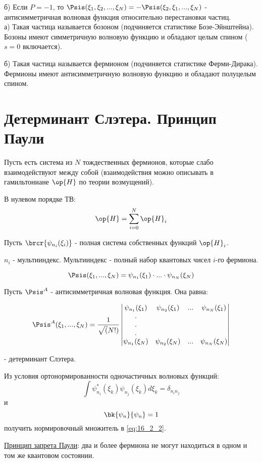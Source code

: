 б) Если $P = -1$, то  $\Psis(\xi_1, \xi_2, ..., \xi_N) = -\Psis(\xi_2, \xi_1, ..., \xi_N)$ - антисимметричная волновая функция относительно перестановки частиц.\\

а) Такая частица называется бозоном (подчиняется статистике Бозе-Эйнштейна). Бозоны имеют симметричную волновую функцию и обладают целым спином ($s = 0$ включается).

б) Такая частица называется фермионом (подчиняется статистике Ферми-Дирака). Фермионы имеют антисимметричную волновую функцию и обладают полуцелым спином.

\section{Детерминант Слэтера. Принцип Паули}

Пусть есть система из $N$ тождественных фермионов, которые слабо взаимодействуют между собой (взаимодействия можно описывать в гамильтониане $\op{H}$ по теории возмущений).

В нулевом порядке ТВ:
$$
\op{H} = \sum_{i=0}^N\op{H}_i
$$

Пусть $\brcr{\psi_{n_i}(\xi_i)}$ - полная система собственных функций $\op{H}_i$.

$n_i$ - мультииндекс. Мультииндекс - полный набор квантовых чисел $i$-го фермиона.

\begin{equation}
\label{eq:16_2_1}
\Psis(\xi_1, ..., \xi_N) = \psi_{n_1}(\xi_1) \cdot ... \cdot \psi_{n_N}(\xi_N)
\end{equation}

Пусть $\Psis^A$ - антисимметричная волновая функция. Она равна:

\begin{equation}
\label{eq:16_2_2}
\Psis^A(\xi_1, ..., \xi_N) = \frac{1}{\sqrt(N!)} \left |
  \begin{matrix} 
  \psi_{n_1}(\xi_1) & \psi_{n_2}(\xi_1) & ... &  \psi_{n_N}(\xi_1) \\
  .                                &                                  &    &                                    \\
  .                                &                                  &    &                                    \\
  .                                &                                  &    &                                    \\
  \psi_{n_1}(\xi_N) & \psi_{n_2}(\xi_N) & ... &  \psi_{n_N}(\xi_N)
  \end{matrix} \right |
\end{equation}

- детерминант Слэтера.

\begin{excr}
Из условия ортонормированности одночастичных волновых функций: 
$$
\int \psi_{n_i}^*(\xi_k) \psi_{n_j}(\xi_k) d\xi_k = \delta_{n_i n_j}
$$
и 
$$
\bk{\psi_n}{\psi_n} = 1
$$
получить нормировочный множитель в \eqref{eq:16_2_2}.
\end{excr}

\underline{Принцип запрета Паули}: два и более фермиона не могут находиться в одном и том же квантовом состоянии.

